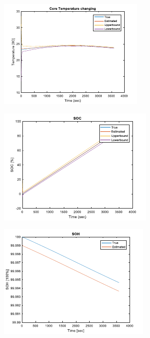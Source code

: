\documentclass[12pt]{article}
\begin{document}
\begin{figure}[H]
\begin{subfigure}[t]{0.3\linewidth}
		\includegraphics[width=\linewidth]{figures/estVTini3.pdf}
	\end{subfigure}
	\begin{subfigure}[t]{0.3\linewidth}
		\includegraphics[width=\linewidth]{figures/estVTini4.pdf}
	\end{subfigure}	
	\begin{subfigure}[t]{0.3\linewidth}
		\includegraphics[width=\linewidth]{figures/estVTini5.pdf}

\end{subfigure}
\end{figure}
\end{document}

